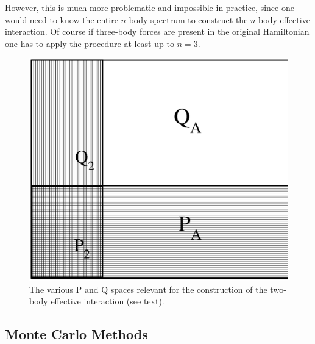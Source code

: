 However, this is much more problematic and  impossible in practice, since one would need to
know the entire $n$-body spectrum to construct the $n$-body effective interaction. 
Of course if three-body forces are present in the original Hamiltonian one has 
to apply the  procedure at least up to $n=3$.  
\begin{figure}
\sidecaption
\includegraphics[scale=.65]{Chapter7-figures/fig1.eps}
%
%
\caption{The various P and Q spaces relevant for the construction
of the two-body effective interaction (see text).}
\label{fig:1}       %
\end{figure}

\subsection{Monte Carlo Methods}\label{sec:MC}

